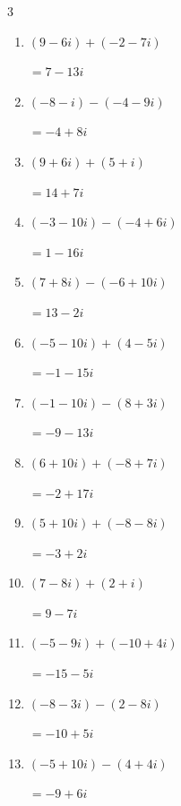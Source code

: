 \begin{multicols}{3}
\begin{enumerate}
        $\displaystyle =-12-13i$

  \item $\displaystyle (9-6i) + (-2-7i)$

        $\displaystyle =7-13i$

  \item $\displaystyle (-8-i) - (-4-9i)$

        $\displaystyle =-4+8i$

  \item $\displaystyle (9+6i) + (5+i)$

        $\displaystyle =14+7i$

  \item $\displaystyle (-3-10i) - (-4+6i)$

        $\displaystyle =1-16i$

  \item $\displaystyle (7+8i) - (-6+10i)$

        $\displaystyle =13-2i$

  \item $\displaystyle (-5-10i) + (4-5i)$

        $\displaystyle =-1-15i$

  \item $\displaystyle (-1-10i) - (8+3i)$

        $\displaystyle =-9-13i$

  \item $\displaystyle (6+10i) + (-8+7i)$

        $\displaystyle =-2+17i$

  \item $\displaystyle (5+10i) + (-8-8i)$

        $\displaystyle =-3+2i$

\columnbreak %

  \item $\displaystyle (7-8i) + (2+i)$

        $\displaystyle =9-7i$

  \item $\displaystyle (-5-9i) + (-10+4i)$

        $\displaystyle =-15-5i$

  \item $\displaystyle (-8-3i) - (2-8i)$

        $\displaystyle =-10+5i$

  \item $\displaystyle (-5+10i) - (4+4i)$

        $\displaystyle =-9+6i$


\end{enumerate}
\end{multicols}
